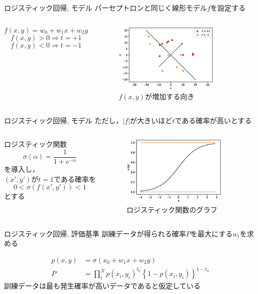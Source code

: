 \documentclass[dvipdfmx,platex]{beamer}
\begin{document}
\begin{frame}{ロジスティック回帰, モデル}
  パーセプトロンと同じく線形モデル$f$を設定する
  \begin{columns}[T,onlytextwidth]
    \[f(x,y)=w_0+w_1x+w_2y\]
    \[f(x,y)>0\Rightarrow t = +1\]
    \[f(x,y)<0\Rightarrow t = -1\]
    \begin{figure}
      \centering
      \includegraphics[width=5cm]{fig/direction.eps}
      \caption{$f(x,y)${\mgfamily が増加する向き}}
    \end{figure}
  \end{columns}
\end{frame}
\begin{frame}{ロジスティック回帰, モデル}
  ただし，$|f|$が大きいほど$t$である確率が高いとする
  \begin{columns}[T,onlytextwidth]
    ロジスティック関数
    \[\sigma\left(\alpha\right)=\frac{1}{1+e^{-\alpha}}\]
    を導入し，\\
    $(x',y')$が$t=1$である確率を\\
    \[0 < \sigma \left(f\left(x',y'\right)\right) < 1\]
    とする
    \begin{figure}
      \centering
      \includegraphics[width=5cm]{fig/sigmoid.eps}
      \caption{{\mgfamily ロジスティック関数のグラフ}}
    \end{figure}
  \end{columns}
\end{frame}
\begin{frame}{ロジスティック回帰, 評価基準}
  訓練データが得られる確率$P$を最大にする$w_i$を求める

  \begin{align*}
    p(x,y)&=\sigma(x_0+w_1x+w_2y)\\
    P&=\prod_{i}^{N}{p\left(x_i,y_i\right)}^{t_n}{\left\{1-p\left(x_i,y_i\right)\right\}}^{1-t_n}
  \end{align*}  
  訓練データは最も発生確率が高いデータであると仮定している
\end{frame}
\end{document}
